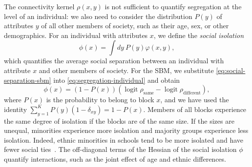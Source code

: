\documentclass{scrartcl}
\DeclareMathOperator{\logit}{logit}
\begin{document}
The connectivity kernel $\rho(x, y)$ is not sufficient to quantify segregation at the level of an individual: we also need to consider the distribution $P(y)$ of attributes $y$ of all other members of society, such as their age, sex, or other demographics. For an individual with attributes $x$, we define the \emph{social isolation}
\begin{equation}
    \phi(x) = \int dy \ P(y) \varphi(x, y),\label{eq:segregation-individual}
\end{equation}
which quantifies the average social separation between an individual with attribute $x$ and other members of society. For the SBM, we substitute \cref{eq:social-separation-sbm} into \cref{eq:segregation-individual} and obtain
\begin{equation}
    \phi(x) = (1-P(x))\left(\logit\rho_\mathrm{same}-\logit\rho_\mathrm{different}\right),\label{eq:segregation-individual-sbm}
\end{equation}
where $P(x)$ is the probability to belong to block $x$, and we have used the identity $\sum_{y=1}^K P(y)\left(1-\delta_{xy}\right)= 1 - P(x)$. Members of all blocks experience the same degree of isolation if the blocks are of the same size. If the sizes are unequal, minorities experience more isolation and majority groups experience less isolation. Indeed, ethnic minorities in schools tend to be more isolated and have fewer social ties~\cite{Currarini2009}. The off-diagonal terms of the Hessian of the social isolation $\phi$ quantify interactions, such as the joint effect of age and ethnic differences.
\end{document}
